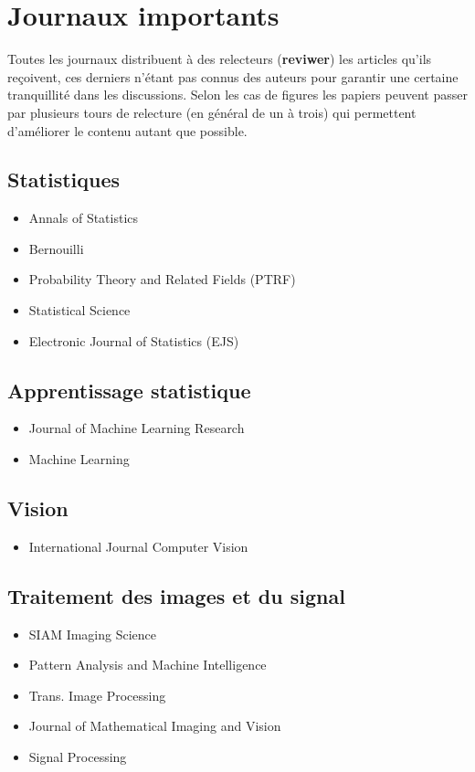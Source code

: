 \section{Journaux importants}



Toutes les journaux distribuent à des relecteurs (\textbf{reviwer})
les articles qu'ils reçoivent, ces derniers n'étant pas connus des auteurs pour garantir une
certaine tranquillité dans les discussions. Selon les cas de figures les papiers peuvent passer
par plusieurs tours de relecture (en général de un à trois) qui permettent d'améliorer 
le contenu autant que possible.

\subsection{Statistiques}
\begin{itemize}
 \item Annals of Statistics
 \item Bernouilli
 \item Probability  Theory and Related Fields (PTRF)
 \item Statistical Science
 \item Electronic Journal of Statistics (EJS)
\end{itemize}

\subsection{Apprentissage statistique}
\begin{itemize}
 \item Journal of Machine Learning Research
 \item Machine Learning
\end{itemize}

\subsection{Vision}
\begin{itemize}
\item International Journal Computer Vision
\end{itemize}

\subsection{Traitement des images et du signal}
\begin{itemize}
 \item SIAM Imaging Science
 \item Pattern Analysis and Machine Intelligence 
 \item Trans. Image Processing
 \item Journal of Mathematical Imaging and Vision
 \item Signal Processing
\end{itemize}




